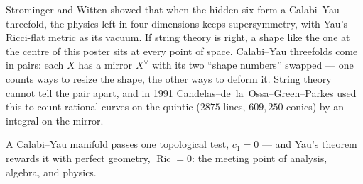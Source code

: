 \documentclass[12pt]{article}
\newcommand{\auterm}[1]{{\PosterSemibold #1}}
\begin{document}
\begin{minipage}[t][\BodyH][s]{0.295\textwidth}
Strominger and Witten showed that when the hidden six form a
Calabi--Yau threefold, the physics left in four dimensions keeps
supersymmetry, with Yau's Ricci-flat metric as its vacuum. If string
theory is right, a shape like the one at the centre of this poster
sits at every point of space.
\vfill
{}
Calabi--Yau threefolds come in pairs: each $X$ has a \auterm{mirror}
$X^{\vee}$ with its two ``shape numbers'' swapped --- one counts ways
to resize the shape, the other ways to deform it. String theory cannot
tell the pair apart, and in 1991 Candelas--de~la~Ossa--Green--Parkes
used this to count rational curves on the quintic ($2875$ lines,
$609{,}250$ conics) by an integral on the mirror.
\vfill
{}
{\PosterSerifTitle\fontsize{24.5}{33.5}\selectfont\raggedright\color{InkBlack}
A Calabi--Yau manifold passes one topological test, $c_1 = 0$ ---
and Yau's theorem rewards it with perfect geometry,
$\operatorname{Ric} = 0$: the meeting point of analysis, algebra, and
physics.\par}

\end{minipage}

\vspace{0.26cm}
\end{document}
